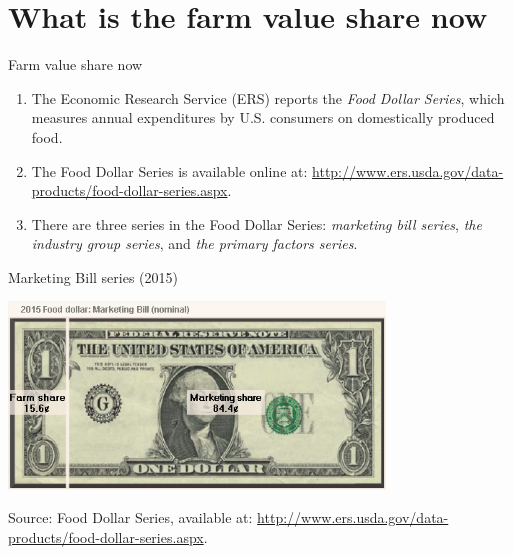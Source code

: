 \documentclass[table,xcolor=pdftex,dvipsnames, handout]{beamer}\usepackage[]{graphicx}\usepackage[]{color}
\begin{document}
\section{What is the farm value share now}

\begin{frame}{Farm value share now}
\begin{enumerate}[label=\textbullet]
  \item The Economic Research Service (ERS) reports the \emph{Food Dollar Series}, which measures annual expenditures by U.S. consumers on domestically produced food.
  \item The Food Dollar Series is available online at: \url{http://www.ers.usda.gov/data-products/food-dollar-series.aspx}.
  \item There are three series in the Food Dollar Series:\emph{ marketing bill series}, \emph{the industry group series}, and \emph{the primary factors series}.
\end{enumerate}
\end{frame}


\begin{frame}{Marketing Bill series (2015)}
    \begin{center}
        \includegraphics[width=0.75\textwidth,height=\textheight,keepaspectratio]{marketing_bill.png}
    \end{center}
    \vspace{-1\baselineskip}
\scriptsize
Source:  Food Dollar Series, available at: \url{http://www.ers.usda.gov/data-products/food-dollar-series.aspx}.
\end{frame}

\end{document}
